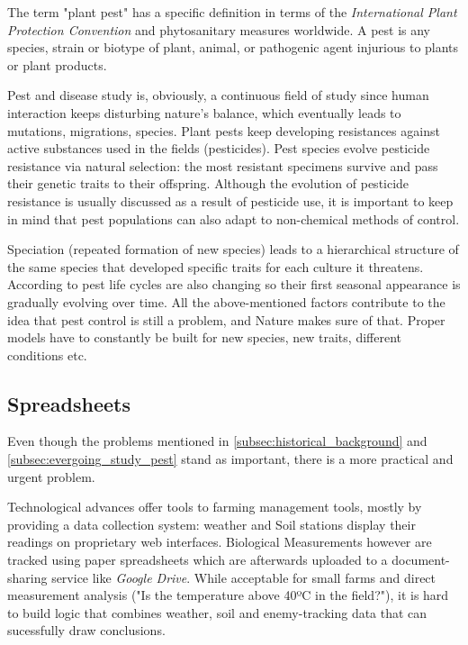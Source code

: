 The term "plant pest" has a specific definition in terms of the \textit{International Plant Protection Convention} and phytosanitary measures worldwide. A pest is any species, strain or biotype of plant, animal, or pathogenic agent injurious to plants or plant products. 

Pest and disease study is, obviously, a continuous field of study since human interaction keeps disturbing nature's balance, which eventually leads to mutations, migrations, species. Plant pests keep developing resistances against active substances used in the fields (pesticides). Pest species evolve pesticide resistance via natural selection: the most resistant specimens survive and pass their genetic traits to their offspring. Although the evolution of pesticide resistance is usually discussed as a result of pesticide use, it is important to keep in mind that pest populations can also adapt to non-chemical methods of control.

Speciation (repeated formation of new species) leads to a hierarchical structure of the same species that developed specific traits for each culture it threatens. According to \cite{Sharma2014} pest life cycles are also changing so their first seasonal appearance is gradually evolving over time. All the above-mentioned factors contribute to the idea that pest control is still a problem, and Nature makes sure of that. Proper models have to constantly be built for new species, new traits, different conditions etc. 


\subsection{Spreadsheets}
\label{subsec:spreadsheets}

Even though the problems mentioned in \ref{subsec:historical_background} and \ref{subsec:evergoing_study_pest} stand as important, there is a more practical and urgent problem.

Technological advances offer tools to farming management tools, mostly by providing a data collection system: weather and Soil stations display their readings on proprietary web interfaces. Biological Measurements however are tracked using paper spreadsheets which are afterwards uploaded to a document-sharing service like \textit{Google Drive}. While acceptable for small farms and direct measurement analysis ("Is the temperature above 40ºC in the field?"), it is hard to build logic that combines weather, soil and enemy-tracking data that can sucessfully draw conclusions.

